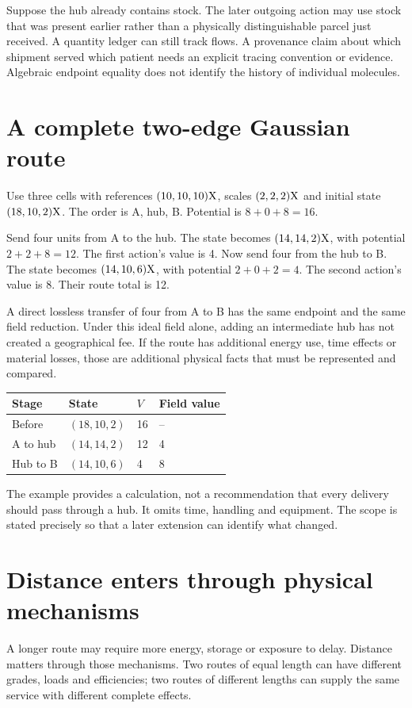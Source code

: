 Suppose the hub already contains stock. The later outgoing action may use stock that was present earlier rather than a physically distinguishable parcel just received. A quantity ledger can still track flows. A provenance claim about which shipment served which patient needs an explicit tracing convention or evidence. Algebraic endpoint equality does not identify the history of individual molecules.

\section{A complete two-edge Gaussian route}
Use three cells with references $(10,10,10)\mathrm{X}$, scales $(2,2,2)\mathrm{X}$ and initial state $(18,10,2)\mathrm{X}$. The order is A, hub, B. Potential is $8+0+8=16$.

Send four units from A to the hub. The state becomes $(14,14,2)\mathrm{X}$, with potential $2+2+8=12$. The first action's value is 4. Now send four from the hub to B. The state becomes $(14,10,6)\mathrm{X}$, with potential $2+0+2=4$. The second action's value is 8. Their route total is 12.

A direct lossless transfer of four from A to B has the same endpoint and the same field reduction. Under this ideal field alone, adding an intermediate hub has not created a geographical fee. If the route has additional energy use, time effects or material losses, those are additional physical facts that must be represented and compared.

\begin{center}
\begin{tabular}{llll}\toprule
Stage & State & $V$ & Field value\\\midrule
Before & $(18,10,2)$ & 16 & --\\
A to hub & $(14,14,2)$ & 12 & 4\\
Hub to B & $(14,10,6)$ & 4 & 8\\\bottomrule
\end{tabular}
\end{center}

The example provides a calculation, not a recommendation that every delivery should pass through a hub. It omits time, handling and equipment. The scope is stated precisely so that a later extension can identify what changed.


\section{Distance enters through physical mechanisms}
A longer route may require more energy, storage or exposure to delay. Distance matters through those mechanisms. Two routes of equal length can have different grades, loads and efficiencies; two routes of different lengths can supply the same service with different complete effects.

